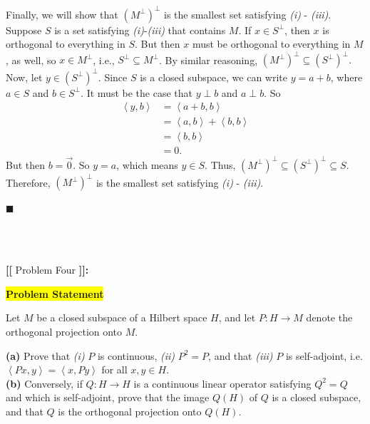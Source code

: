\documentclass[12pt]{article}
\newcommand{\mybox}{%
    \collectbox{%
        \setlength{\fboxsep}{2pt}%
        \fbox{\BOXCONTENT}%
    }%
}
\begin{document}
Finally, we will show that $\left(M^{\perp}\right)^{\perp}$ is the smallest set satisfying \textit{(i)} - \textit{(iii)}. Suppose $S$ is a set satisfying \textit{(i)}-\textit{(iii)} that contains $M$. If $x\in S^{\perp}$, then $x$ is orthogonal to everything in $S$. But then $x$ must be orthogonal to everything in $M$, as well, so $x\in M^{\perp}$, i.e., $S^{\perp}\subseteq M^{\perp}$. By similar reasoning, $\left(M^{\perp}\right)^{\perp} \subseteq \left(S^{\perp}\right)^{\perp}.$ Now, let $y\in \left(S^{\perp}\right)^{\perp}$. Since $S$ is a closed subspace, we can write $y = a + b$, where $a\in S$ and $b\in S^{\perp}$. It must be the case that $y\perp b$ and $a\perp b$. So
\begin{align}
    \left<y, b\right> &= \left<a+b, b\right> \\
    &= \left<a, b\right> + \left<b, b\right> \\
    &= \left<b, b\right> \\
    &= 0.
\end{align}
But then $b=\vec{0}$. So $y = a$, which means $y\in S$. Thus, $\left(M^{\perp}\right)^{\perp}\subseteq\left(S^{\perp}\right)^{\perp}\subseteq S$. Therefore, $\left(M^{\perp}\right)^{\perp}$ is the smallest set satisfying \textit{(i)} - \textit{(iii)}. 

\hfill$\blacksquare$

\vfill

\begin{center}
\\
\vspace{2mm}
\vspace{-0.65cm}
\hrulefill \\
\vspace{-0.95cm}
\hrulefill
\end{center}

\pagebreak

\noindent \textbf{{\huge [}{\Large [}} Problem Four \textbf{{\Large ]}{\huge ]}}{\Large \textbf{:}}

\noindent\mybox{\colorbox{yellow}{\textbf{Problem Statement}}}\hspace{3mm}\hrulefill 

\noindent Let $M$ be a closed subspace of a Hilbert space $H$, and let $P: H \longrightarrow M$ denote the orthogonal projection onto $M$.
\begin{flushleft}
\textbf{(a)} Prove that \textit{(i)} $P$ is continuous, \textit{(ii)} $P^2=P$, and that \textit{(iii)} $P$ is self-adjoint, i.e. $\left<Px,y\right> = \left<x,Py\right>$ for all $x,y\in H$. \\
\textbf{(b)} Conversely, if $Q:H\longrightarrow H$ is a continuous linear operator satisfying $Q^2 = Q$ and which is self-adjoint, prove that the image $Q(H)$ of $Q$ is a closed subspace, and that $Q$ is the orthogonal projection onto $Q(H).$
\end{flushleft}
\end{document}
